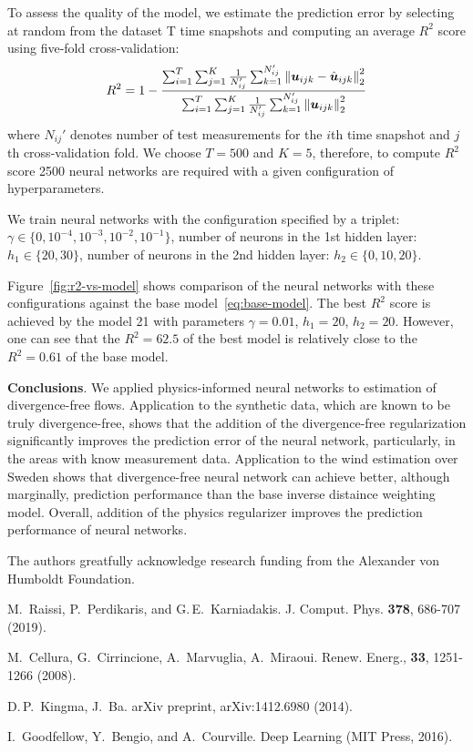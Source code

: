 \documentclass[pamm,a4paper,fleqn]{w-art}
\renewcommand{\vec}[1]{\boldsymbol{#1}}
\newcommand{\norm}[1]{\left\lVert#1\right\rVert}
\begin{document}
To assess the quality of the model, we estimate the prediction error
by selecting at random from the dataset T time snapshots and computing
an average $R^2$ score using five-fold cross-validation:
\[
  R^2 = 1 - \frac{%
    \sum_{i=1}^T \sum_{j=1}^K \frac{1}{N_{ij}'}
    \sum_{k=1}^{N_{ij}'} \norm{\vec{u}_{ijk} - \hat{\vec{u}}_{ijk}}^2_2}
  {%
    \sum_{i=1}^T \sum_{j=1}^K \frac{1}{N_{ij}'}
    \sum_{k=1}^{N_{ij}'} \norm{\vec{u}_{ijk}}^2_2}
\]
where $N_{ij}'$ denotes number of test measurements for the $i$th time snapshot
and $j$th cross-validation fold.
We choose $T=500$ and $K=5$, therefore, to compute $R^2$ score 2500 neural
networks are required with a given configuration of hyperparameters.

We train neural networks with the configuration specified by a triplet: 
$\gamma \in \{0, 10^{-4}, 10^{-3}, 10^{-2}, 10^{-1}\}$, 
number of neurons in the 1st hidden layer: $h_1 \in \{20, 30\}$,
number of neurons in the 2nd hidden layer: $h_2 \in \{0, 10, 20\}$.

Figure~\ref{fig:r2-vs-model} shows comparison of the neural networks with these
configurations against the base model~\eqref{eq:base-model}.
The best $R^2$ score is achieved by the model 21 with parameters $\gamma=0.01$,
$h_1=20$, $h_2=20$.
However, one can see that the $R^2=62.5$ of the best model is relatively close
to the $R^2=0.61$ of the base model.

\textbf{Conclusions}.
We applied physics-informed neural networks to estimation of divergence-free
flows.
Application to the synthetic data, which are known to be truly divergence-free,
shows that the addition of the divergence-free regularization significantly
improves the prediction error of the neural network, particularly, in the areas
with know measurement data.
Application to the wind estimation over Sweden shows that divergence-free neural
network can achieve better, although marginally, prediction performance than
the base inverse distaince weighting model.
Overall, addition of the physics regularizer improves the prediction performance
of neural networks.

\begin{acknowledgement}
  The authors greatfully acknowledge research funding from the Alexander von
  Humboldt Foundation.
\end{acknowledgement}

\vspace{\baselineskip}

\begin{thebibliography}{1}

  M.~Raissi, P.~Perdikaris, and G.\,E.~Karniadakis.
  J. Comput. Phys. \textbf{378}, 686-707 (2019).

  M.~Cellura, G.~Cirrincione, A.~Marvuglia, A.~Miraoui.
  Renew. Energ., \textbf{33}, 1251-1266 (2008).

  D.\,P.~Kingma, J.~Ba.
  arXiv preprint, arXiv:1412.6980 (2014).

  I.~Goodfellow, Y.~Bengio, and A.~Courville.
  Deep Learning (MIT Press, 2016).

\end{thebibliography}
\end{document}
